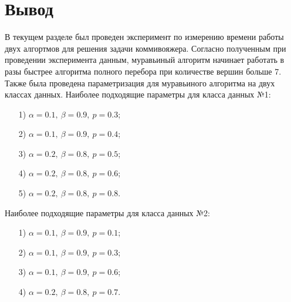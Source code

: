 \section*{Вывод}

В текущем разделе был проведен эксперимент по измерению времени работы двух алгортмов для решения задачи коммивояжера. 
Согласно полученным при проведении эксперимента данным, муравьиный алгоритм начинает работать в разы быстрее алгоритма полного перебора при количестве вершин больше 7. 
Также была проведена параметризация для муравьиного алгоритма на двух классах данных. 
Наиболее подходящие параметры для класса данных №1:
\begin{enumerate}
	\item[1)] $\alpha = 0.1,~\beta = 0.9,~p = 0.3$;
	\item[2)] $\alpha = 0.1,~\beta = 0.9,~p = 0.4$;
	\item[3)] $\alpha = 0.2,~\beta = 0.8,~p = 0.5$;
	\item[4)] $\alpha = 0.2,~\beta = 0.8,~p = 0.6$;
	\item[5)] $\alpha = 0.2,~\beta = 0.8,~p = 0.8$.
\end{enumerate}
Наиболее подходящие параметры для класса данных №2:
\begin{enumerate}
	\item[1)] $\alpha = 0.1,~\beta = 0.9,~p = 0.1$;
	\item[2)] $\alpha = 0.1,~\beta = 0.9,~p = 0.3$;
	\item[3)] $\alpha = 0.1,~\beta = 0.9,~p = 0.6$;
	\item[4)] $\alpha = 0.2,~\beta = 0.8,~p = 0.7$.
\end{enumerate}
